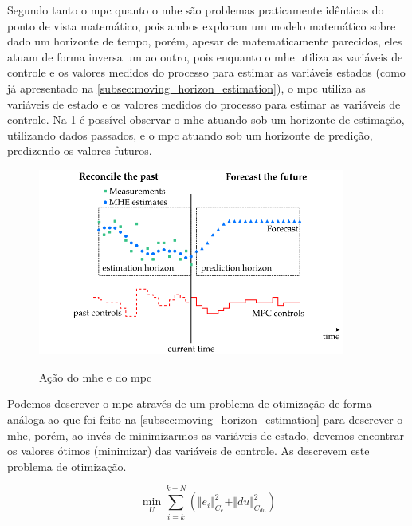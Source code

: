 Segundo  tanto o \acrshort{mpc} quanto o \acrshort{mhe} são problemas praticamente
idênticos do ponto de vista matemático, pois ambos exploram um modelo matemático sobre dado um horizonte de
tempo, porém, apesar de matematicamente parecidos, eles atuam de forma inversa um ao outro, pois
enquanto o \acrshort{mhe} utiliza as variáveis de controle e os valores medidos do processo para estimar
as variáveis estados (como já apresentado na \cref{subsec:moving_horizon_estimation}), o \acrshort{mpc}
utiliza as variáveis de estado e os valores medidos do processo para estimar as variáveis de controle.
Na \cref{fig:mhe_mpc} é possível observar o \acrshort{mhe} atuando sob um horizonte de estimação, utilizando
dados passados, e o \acrshort{mpc} atuando sob um horizonte de predição, predizendo os valores futuros.

\begin{figure}
    \caption{Ação do \acrlong{mhe} e do \acrlong{mpc}}
	\begin{center}
		\includegraphics[width=0.9\textwidth]{./5_images/fig_mhe_mpc.png} 
		\label{fig:mhe_mpc}
	\end{center}
    \centering
\end{figure}

Podemos descrever o \acrshort{mpc} através de um problema de otimização de forma análoga ao que foi feito
na \cref{subsec:moving_horizon_estimation} para descrever o \acrshort{mhe}, porém, ao invés de minimizarmos
as variáveis de estado, devemos encontrar os valores ótimos (minimizar) das variáveis de controle.
As  descrevem este problema de otimização.

\begin{equation}
	\label{eq:mpc_minimization}
	\min_{U} \sum_{i=k}^{k+N} ( \Vert e_i \Vert^2_{C_e} + \Vert du \Vert^2_{C_{du}} )
\end{equation}

